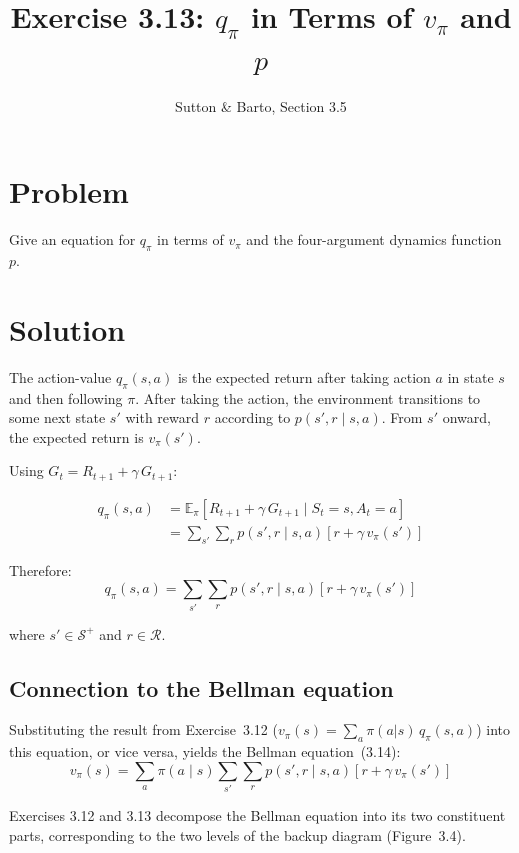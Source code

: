 \documentclass[11pt]{article}
\title{Exercise 3.13: $q_\pi$ in Terms of $v_\pi$ and $p$}
\author{Sutton \& Barto, Section 3.5}
\date{}
\begin{document}
\maketitle

\section*{Problem}

Give an equation for $q_\pi$ in terms of $v_\pi$ and the four-argument
dynamics function $p$.

\section*{Solution}

The action-value $q_\pi(s,a)$ is the expected return after taking action $a$
in state $s$ and then following $\pi$. After taking the action, the environment
transitions to some next state $s'$ with reward $r$ according to $p(s',r \mid s,a)$.
From $s'$ onward, the expected return is $v_\pi(s')$.

Using $G_t = R_{t+1} + \gamma\, G_{t+1}$:

\begin{align*}
    q_\pi(s, a) &= \mathbb{E}_\pi[R_{t+1} + \gamma\, G_{t+1} \mid S_t = s, A_t = a] \\
                &= \sum_{s'} \sum_{r} p(s', r \mid s, a) \left[ r + \gamma\, v_\pi(s') \right]
\end{align*}

Therefore:
\[
    \boxed{q_\pi(s, a) = \sum_{s'} \sum_{r} p(s', r \mid s, a) \left[ r + \gamma\, v_\pi(s') \right]}
\]

where $s' \in \mathcal{S}^+$ and $r \in \mathcal{R}$.

\subsection*{Connection to the Bellman equation}

Substituting the result from Exercise~3.12 ($v_\pi(s) = \sum_a \pi(a|s)\, q_\pi(s,a)$)
into this equation, or vice versa, yields the Bellman equation~(3.14):
\[
    v_\pi(s) = \sum_{a} \pi(a \mid s) \sum_{s'} \sum_{r}
    p(s', r \mid s, a) \left[ r + \gamma\, v_\pi(s') \right]
\]

Exercises 3.12 and 3.13 decompose the Bellman equation into its two constituent
parts, corresponding to the two levels of the backup diagram (Figure~3.4).
\end{document}
